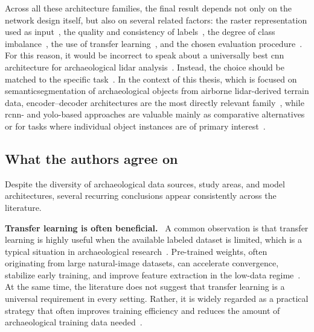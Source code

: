 Across all these architecture families, the final result depends not only on the network design itself, but also on several related factors: the raster representation used as input~\cite{somrak_learning_2020,kokalj_standardizing_2025}, the quality and consistency of labels~\cite{griffiths_improving_2019,bundzel_semantic_2020}, the degree of class imbalance~\cite{Cui_2019_CVPR,zhou_dynamic_2023,bischke_segmentation_2018}, the use of transfer learning~\cite{pan_survey_2010,wurm_semantic_2019,zhang_semantic_2023}, and the chosen evaluation procedure~\cite{fiorucci_deep_2022,guyot_objective_2021}. For this reason, it would be incorrect to speak about a universally best \gls{cnn} architecture for archaeological \gls{lidar} analysis~\cite{bundzel_semantic_2020,somrak_learning_2020}. Instead, the choice should be matched to the specific task~\cite{fiorucci_deep_2022}. In the context of this thesis, which is focused on \gls{semanticsegmentation} of archaeological objects from airborne \gls{lidar}-derived terrain data, encoder--decoder architectures are the most directly relevant family~\cite{zhao_semantic_2022}, while \gls{rcnn}- and \gls{yolo}-based approaches are valuable mainly as comparative alternatives or for tasks where individual object instances are of primary interest~\cite{zhang_unveiling_2024,verschoof-van_der_vaart_combining_2020}.

\subsection{What the authors agree on}
Despite the diversity of archaeological data sources, study areas, and model architectures, several recurring conclusions appear consistently across the literature.

\textbf{Transfer learning is often beneficial.}~\cite{cui_semantic_2020,wurm_semantic_2019}
A common observation is that transfer learning is highly useful when the available labeled dataset is limited, which is a typical situation in archaeological research~\cite{guyot_objective_2021,somrak_learning_2020}. Pre-trained weights, often originating from large natural-image datasets, can accelerate convergence, stabilize early training, and improve feature extraction in the low-data regime~\cite{cui_semantic_2020,zhang_semantic_2023}. At the same time, the literature does not suggest that transfer learning is a universal requirement in every setting. Rather, it is widely regarded as a practical strategy that often improves training efficiency and reduces the amount of archaeological training data needed~\cite{bundzel_semantic_2020,verschoof-van_der_vaart_combining_2020}.

